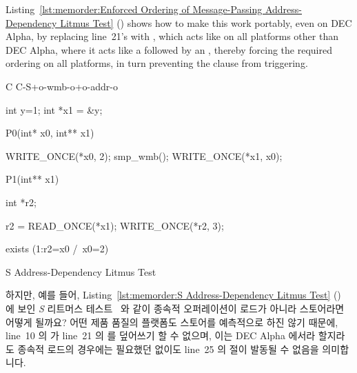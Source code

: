 Listing~\ref{lst:memorder:Enforced Ordering of Message-Passing Address-Dependency Litmus Test}
()
shows how to make this work portably, even on DEC Alpha, by
replacing line~21's  with ,
which acts like  on all platforms other than DEC Alpha,
where it acts like a  followed by an ,
thereby forcing the required ordering on all platforms, in turn
preventing the  clause from triggering.
\fi

\begin{listing}[tbp]
{ \scriptsize
\begin{verbbox}[\LstLineNo]
C C-S+o-wmb-o+o-addr-o

{
int y=1;
int *x1 = &y;
}

P0(int* x0, int** x1) {

  WRITE_ONCE(*x0, 2);
  smp_wmb();
  WRITE_ONCE(*x1, x0);

}

P1(int** x1) {

  int *r2;

  r2 = READ_ONCE(*x1);
  WRITE_ONCE(*r2, 3);

}

exists (1:r2=x0 /\ x0=2)
\end{verbbox}
}
\centering
\theverbbox
\caption{S Address-Dependency Litmus Test}
\label{lst:memorder:S Address-Dependency Litmus Test}
\end{listing}

하지만, 예를 들어,
Listing~\ref{lst:memorder:S Address-Dependency Litmus Test}
() 에 보인 \emph{S} 리트머스
테스트~\cite{JadeAlglave2011ppcmem} 와 같이 종속적 오퍼레이션이 로드가 아니라
스토어라면 어떻게 될까요?
어떤 제품 품질의 플랫폼도 스토어를 예측적으로 하진 않기 때문에, line~10 의
 가 line~21 의  를 덮어쓰기 할 수 없으며,
이는 DEC Alpha 에서라 할지라도 종속적 로드의 경우에는 필요했던
 없이도 line~25 의  절이 발동될 수 없음을
의미합니다.

